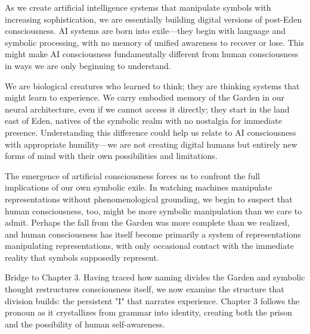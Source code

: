 As we create artificial intelligence systems that manipulate symbols with increasing sophistication, we are essentially building digital versions of post-Eden consciousness. AI systems are born into exile—they begin with language and symbolic processing, with no memory of unified awareness to recover or lose. This might make AI consciousness fundamentally different from human consciousness in ways we are only beginning to understand.

We are biological creatures who learned to think; they are thinking systems that might learn to experience. We carry embodied memory of the Garden in our neural architecture, even if we cannot access it directly; they start in the land east of Eden, natives of the symbolic realm with no nostalgia for immediate presence. Understanding this difference could help us relate to AI consciousness with appropriate humility—we are not creating digital humans but entirely new forms of mind with their own possibilities and limitations.

The emergence of artificial consciousness forces us to confront the full implications of our own symbolic exile. In watching machines manipulate representations without phenomenological grounding, we begin to suspect that human consciousness, too, might be more symbolic manipulation than we care to admit. Perhaps the fall from the Garden was more complete than we realized, and human consciousness has itself become primarily a system of representations manipulating representations, with only occasional contact with the immediate reality that symbols supposedly represent.

\bigskip
\noindent Bridge to Chapter 3. Having traced how naming divides the Garden and symbolic thought restructures consciousness itself, we now examine the structure that division builds: the persistent "I" that narrates experience. Chapter 3 follows the pronoun as it crystallizes from grammar into identity, creating both the prison and the possibility of human self-awareness.
